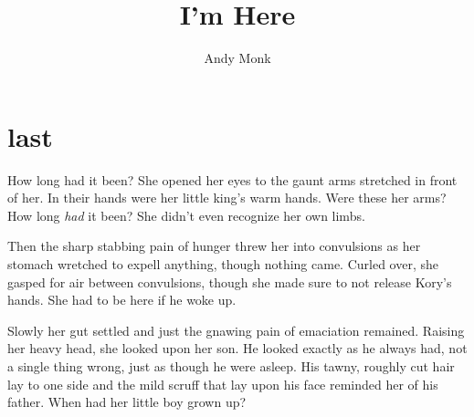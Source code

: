 \documentclass[11pt]{memoir}
\title{I'm Here}
\author{Andy Monk}
\begin{document}
\clearpage
\maketitle
\thispagestyle{empty}




\frontmatter



\mainmatter

\chapter*{last}

How long had it been? She opened her eyes to the gaunt arms stretched in front of her. In their hands were her little king's warm hands. Were these her arms? How long \textit{had} it been? She didn't even recognize her own limbs.

Then the sharp stabbing pain of hunger threw her into convulsions as her stomach wretched to expell anything, though nothing came. Curled over, she gasped for air between convulsions, though she made sure to not release Kory's hands. She had to be here if he woke up.

Slowly her gut settled and just the gnawing pain of emaciation remained. Raising her heavy head, she looked upon her son. He looked exactly as he always had, not a single thing wrong, just as though he were asleep. His tawny, roughly cut hair lay to one side and the mild scruff that lay upon his face reminded her of his father. When had her little boy grown up?


\backmatter
\end{document}
